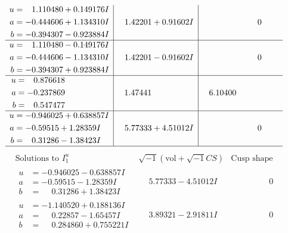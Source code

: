 \documentclass[1p]{elsarticle_modified}
\theoremstyle{definition}
\newcommand{\I}{\sqrt{-1}}
\begin{document}
$$\begin{array}{c|c|c}
\begin{aligned}
u &= \phantom{-}1.110480 + 0.149176 I \\
a &= -0.444606 + 1.134310 I \\
b &= -0.394307 - 0.923884 I\end{aligned}
 & \phantom{-}1.42201 + 0.91602 I & \phantom{-0.000000 } 0 \\ \hline\begin{aligned}
u &= \phantom{-}1.110480 - 0.149176 I \\
a &= -0.444606 - 1.134310 I \\
b &= -0.394307 + 0.923884 I\end{aligned}
 & \phantom{-}1.42201 - 0.91602 I & \phantom{-0.000000 } 0 \\ \hline\begin{aligned}
u &= \phantom{-}0.876618\phantom{ +0.000000I} \\
a &= -0.237869\phantom{ +0.000000I} \\
b &= \phantom{-}0.547477\phantom{ +0.000000I}\end{aligned}
 & \phantom{-}1.47441\phantom{ +0.000000I} & \phantom{-}6.10400\phantom{ +0.000000I} \\ \hline\begin{aligned}
u &= -0.946025 + 0.638857 I \\
a &= -0.59515 + 1.28359 I \\
b &= \phantom{-}0.31286 - 1.38423 I\end{aligned}
 & \phantom{-}5.77333 + 4.51012 I & \phantom{-0.000000 } 0\\
 \hline 
 \end{array}$$\newpage$$\begin{array}{c|c|c}  
\text{Solutions to }I^u_{1}& \I (\text{vol} + \sqrt{-1}CS) & \text{Cusp shape}\\
 \hline 
\begin{aligned}
u &= -0.946025 - 0.638857 I \\
a &= -0.59515 - 1.28359 I \\
b &= \phantom{-}0.31286 + 1.38423 I\end{aligned}
 & \phantom{-}5.77333 - 4.51012 I & \phantom{-0.000000 } 0 \\ \hline\begin{aligned}
u &= -1.140520 + 0.188136 I \\
a &= \phantom{-}0.22857 - 1.65457 I \\
b &= \phantom{-}0.284860 + 0.755221 I\end{aligned}
 & \phantom{-}3.89321 - 2.91811 I & \phantom{-0.000000 } 0 \\ \hline\begin{aligned}

\end{aligned}
\end{array}$$
\end{document}
